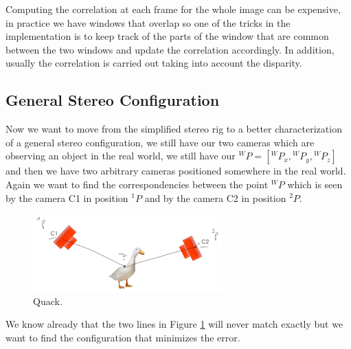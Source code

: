 Computing the correlation at each frame for the whole image
can be expensive, in practice we have windows that overlap so one of the tricks in the implementation is to keep track of the parts of the window that are common between the two windows and update the correlation accordingly. In addition, usually the correlation is carried out taking into account the disparity.

\subsection{General Stereo Configuration}

Now we want to move from the simplified stereo rig to a better characterization of a general stereo configuration, we still have our two cameras which are observing an object in the real world, we still have our \({}^WP=[{}^WP_x, {}^WP_y,{}^WP_z]\) and then we have two arbitrary cameras positioned somewhere in the real world. Again we want to find the correspondencies between the point \({}^WP\) which is seen by the camera C1 in position \({}^1P\) and by the camera C2 in position \({}^2P\).

\begin{figure}[H]
    \centering
    \includegraphics[width=0.65\textwidth]{Figures/duck.png}
    \caption{Quack.}
    \label{fig:duck}
\end{figure}

We know already that the two lines in Figure \ref{fig:duck} will never match exactly but we want to find the configuration that minimizes the error.


